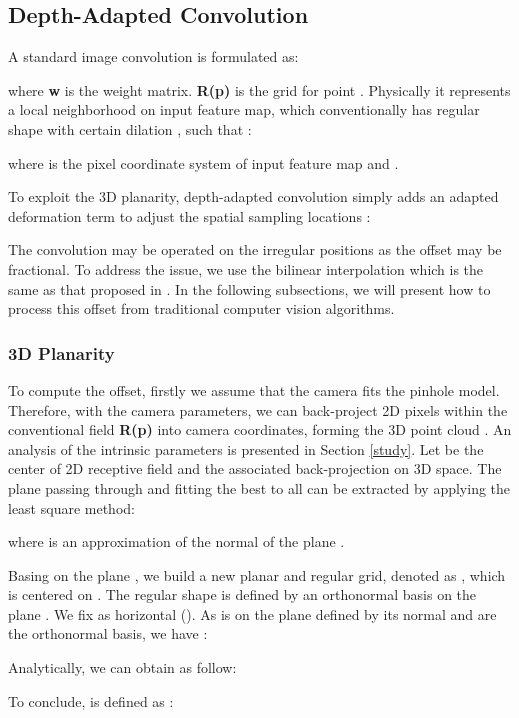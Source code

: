 \documentclass[lettersize,journal]{IEEEtran}
\begin{document}
\subsection{Depth-Adapted Convolution}

A standard image convolution is formulated as: 

where \textbf{w} is the weight matrix. \textbf{R(p)} is the grid for point . Physically it represents a local neighborhood on input feature map, which conventionally has regular shape with certain dilation , such that : 

where  is the pixel coordinate system of input feature map and .


To exploit the 3D planarity, depth-adapted convolution simply adds an adapted deformation term  to adjust the spatial sampling locations : 


The convolution may be operated on the irregular positions  as the offset  may be fractional. To address the issue, we use the bilinear interpolation which is the same as that proposed in \cite{dai2017deformable}. In the following subsections, we will present how to process this offset from traditional computer vision algorithms.


\subsubsection{3D Planarity}


To compute the offset, firstly we assume that the camera fits the pinhole model. Therefore, with the camera parameters, we can back-project 2D pixels within the conventional field \textbf{R(p)} into camera coordinates, forming the 3D point cloud  . An analysis of the intrinsic parameters is presented in Section \ref{study}. Let  be the center of 2D receptive field and  the associated back-projection on 3D space. The plane  passing through  and fitting the best to all  can be extracted by applying the least square method:


where  is an approximation of the normal of the plane .


Basing on the plane , we build a new planar and regular grid, denoted as , which is centered on . The regular shape is defined by an orthonormal basis  on the plane . We fix  as horizontal (). As  is on the plane  defined by its normal  and  are the orthonormal basis, we have : 


Analytically, we can obtain  as follow:

To conclude,  is defined as : 
\end{document}
